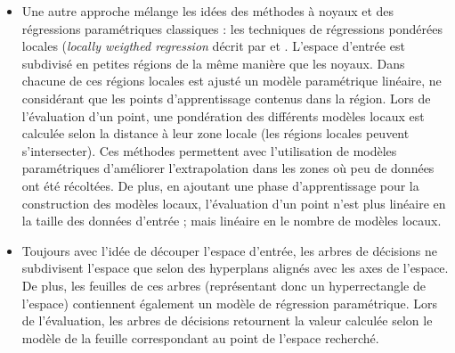 \begin{itemize}
        une très bonne vitesse de convergence (efficacité dans l'utilisation des données) 
        et leurs méta paramètres peuvent être automatiquement réglés.
        Malheureusement, les algorithmes d'apprentissage et d'évaluation sont respectivement cubique 
        et quadratique en la taille des données d'entrées.
        C'est l'amélioration de cette complexité qui motive ce domaine 
        de recherche (subdivision de l'espace, matrices creuses, ...).
        Sans cela, la malédiction de la dimension restreint leurs applications 
        à de faibles dimensions\footnote{Les processus gaussiens ont néanmoins 
        fait leurs preuves sur des problèmes \og simples \fg. L'exemple le plus connu, PILCO, 
        réalise l'apprentissage du modèle dynamique et le contrôle d'un pendule inversé physique
        (\cite{deisenroth_pilco:_2011}) en un très peu d'itérations.}.
    \item Une autre approche mélange les idées des méthodes à noyaux et des régressions 
        paramétriques classiques : les techniques de régressions pondérées locales 
        (\textit{locally weigthed regression} décrit par \cite{cleveland_locally_1988}
        et \cite{christopher_locally_1997}. 
        L'espace d'entrée est subdivisé en petites régions de la même manière que les noyaux. 
        Dans chacune de ces régions locales est ajusté un modèle paramétrique linéaire, 
        ne considérant que les points d'apprentissage contenus dans la région.
        Lors de l'évaluation d'un point, une pondération des différents modèles locaux est
        calculée selon la distance à leur zone locale (les régions locales peuvent s'intersecter).
        Ces méthodes permettent avec l'utilisation de modèles paramétriques d'améliorer l'extrapolation
        dans les zones où peu de données ont été récoltées. De plus, en ajoutant une phase d'apprentissage
        pour la construction des modèles locaux, l'évaluation d'un point n'est plus linéaire en la taille 
        des données d'entrée ; mais linéaire en le nombre de modèles locaux.
    \item Toujours avec l'idée de découper l'espace d'entrée, les arbres de décisions 
        ne subdivisent l'espace que selon des hyperplans alignés avec les axes de l'espace.
        De plus, les feuilles de ces arbres (représentant donc un hyperrectangle de l'espace) contiennent
        également un modèle de régression paramétrique. 
        Lors de l'évaluation, les arbres de décisions retournent la valeur calculée selon 
        le modèle de la feuille correspondant au point de l'espace recherché.

\end{itemize}
